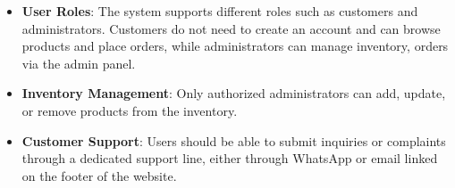 \documentclass[oneside,a4paper,12pt,explicit]{book}
\begin{document}
\begin{itemize}
\item \textbf{User Roles}: The system supports different roles such as customers and administrators. Customers do not need to create an account and can browse products and place orders, while administrators can manage inventory, orders via the admin panel.
\item \textbf{Inventory Management}: Only authorized administrators can add, update, or remove products from the inventory.
\item \textbf{Customer Support}: Users should be able to submit inquiries or complaints through a dedicated support line, either through WhatsApp or email linked on the footer of the website.
\end{itemize}

\cleardoublepage
{}
\printindex
\end{document}
